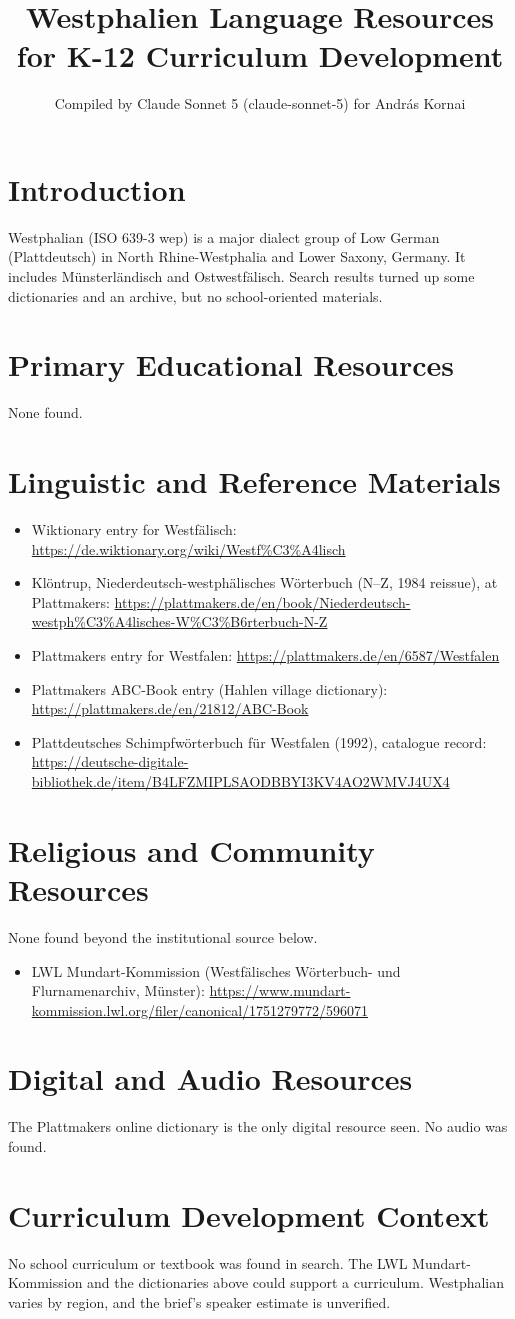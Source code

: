 \documentclass[12pt]{article}
\title{Westphalien Language Resources for K-12 Curriculum Development}
\author{Compiled by Claude Sonnet 5 (claude-sonnet-5) for Andr\'as Kornai}
\date{}
\begin{document}
\maketitle
\section{Introduction}
Westphalian (ISO 639-3 wep) is a major dialect group of Low German (Plattdeutsch) in North Rhine-Westphalia and Lower Saxony, Germany. It includes M\"unsterl\"andisch and Ostwestf\"alisch. Search results turned up some dictionaries and an archive, but no school-oriented materials.
\section{Primary Educational Resources}
None found.
\section{Linguistic and Reference Materials}
\begin{itemize}
\item Wiktionary entry for Westf\"alisch: \url{https://de.wiktionary.org/wiki/Westf%C3%A4lisch}
\item Kl\"ontrup, Niederdeutsch-westph\"alisches W\"orterbuch (N--Z, 1984 reissue), at Plattmakers: \url{https://plattmakers.de/en/book/Niederdeutsch-westph%C3%A4lisches-W%C3%B6rterbuch-N-Z}
\item Plattmakers entry for Westfalen: \url{https://plattmakers.de/en/6587/Westfalen}
\item Plattmakers ABC-Book entry (Hahlen village dictionary): \url{https://plattmakers.de/en/21812/ABC-Book}
\item Plattdeutsches Schimpfw\"orterbuch f\"ur Westfalen (1992), catalogue record: \url{https://deutsche-digitale-bibliothek.de/item/B4LFZMIPLSAODBBYI3KV4AO2WMVJ4UX4}
\end{itemize}
\section{Religious and Community Resources}
None found beyond the institutional source below.
\begin{itemize}
\item LWL Mundart-Kommission (Westf\"alisches W\"orterbuch- und Flurnamenarchiv, M\"unster): \url{https://www.mundart-kommission.lwl.org/filer/canonical/1751279772/596071}
\end{itemize}
\section{Digital and Audio Resources}
The Plattmakers online dictionary is the only digital resource seen. No audio was found.
\section{Curriculum Development Context}
No school curriculum or textbook was found in search. The LWL Mundart-Kommission and the dictionaries above could support a curriculum. Westphalian varies by region, and the brief's speaker estimate is unverified.
\end{document}
